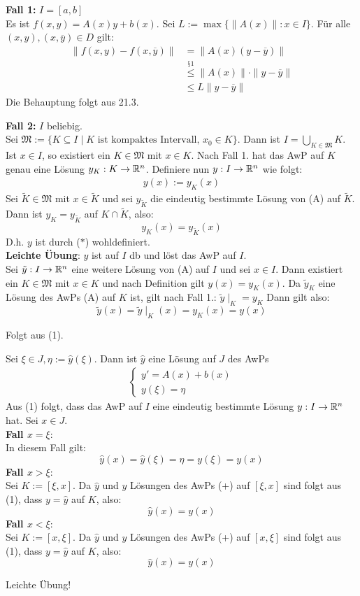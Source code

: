 \documentclass[a4paper,twoside,DIV15,BCOR12mm,chapterprefix=true,headings=twolinechapter]{scrbook}
\begin{document}
\begin{beweise}
\item \textbf{Fall 1:} $I=[a,b]$\\
Es ist $f(x,y)=A(x)y+b(x)$. Sei $L:=\max\{\|A(x)\|:x\in I\}$. Für alle $(x,y),(x,\overline y)\in D$ gilt:
\begin{align*}
\|f(x,y)-f(x,\overline y) \| &=\|A(x)(y-\overline y)\|\\
&\stackrel{\text{§1}}{\le} \|A(x)\|\cdot\|y-\overline y\|\\
&\le L\|y-\overline y\|
\end{align*}
Die Behauptung folgt aus 21.3.

\textbf{Fall 2:} $I$ beliebig.\\
Sei $\mathfrak{M}:=\{K\subseteq I\mid K\text{ ist kompaktes Intervall, } x_0\in K\}$.
Dann ist $I=\bigcup_{K\in\mathfrak{M}} K$.\\
Ist $x\in I$, so existiert ein $K\in\mathfrak{M}$ mit $x\in K$. Nach Fall 1. hat das
AwP auf $K$ genau eine Lösung $y_K:K\to\mathbb{R}^n$. Definiere nun $y:I\to\mathbb{R}^n$ wie folgt:
\begin{align}
y(x):=y_K(x)\tag{$*$}
\end{align}
Sei $\tilde K\in\mathfrak{M}$ mit $x\in\tilde K$ und sei $y_{\tilde K}$ die eindeutig
bestimmte Lösung von (A) auf $\tilde K$. Dann ist $y_K=y_{\tilde K}$ auf $K\cap\tilde K$, also:
\[y_K(x)=y_{\tilde K}(x)\]
D.h. $y$ ist durch ($*$) wohldefiniert.\\
\textbf{Leichte Übung}: $y$ ist auf $I$ db und löst das AwP auf $I$.\\
Sei $\tilde y:I\to\mathbb{R}^n$ eine weitere Lösung von (A) auf $I$ und sei $x\in I$.
Dann existiert ein $K\in\mathfrak{M}$ mit $x\in K$ und nach Definition gilt $y(x)=y_K(x)$.
Da $\tilde y_K$ eine Lösung des AwPs (A) auf $K$ ist, gilt nach Fall 1.: $\tilde y\mid_K=y_K$
Dann gilt also:
\[\tilde y(x)=\tilde y\mid_K(x)=y_K(x)=y(x)\]
\item Folgt aus (1).
\item Sei $\xi \in J,\eta:=\hat y(\xi)$. Dann ist $\hat y$ eine Lösung auf $J$ des AwPs
\begin{align*}
\tag{+}
\begin{cases}
y'=A(x)+b(x)\\
y(\xi)=\eta
\end{cases}
\end{align*}
Aus (1) folgt, dass das AwP auf $I$ eine eindeutig bestimmte Lösung $y:I\to\mathbb{R}^n$ hat. Sei $x\in J$.\\
\textbf{Fall $x=\xi$}:\\
In diesem Fall gilt: 
\[\hat y(x)=\hat y(\xi)=\eta=y(\xi)=y(x)\]
\textbf{Fall $x>\xi$}:\\
Sei $K:=[\xi,x]$. Da $\hat y$ und $y$ Lösungen des AwPs (+) auf $[\xi,x]$ sind folgt aus
(1), dass $y=\hat y$ auf $K$, also:
\[\hat y(x)=y(x)\]
\textbf{Fall $x<\xi$}:\\
Sei $K:=[x,\xi]$. Da $\hat y$ und $y$ Lösungen des AwPs (+) auf $[x,\xi]$ sind folgt aus
(1), dass $y=\hat y$ auf $K$, also:
\[\hat y(x)=y(x)\]
\item Leichte Übung!	
\end{beweise}
\end{document}
